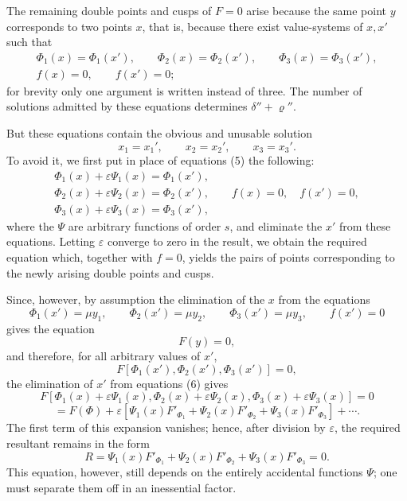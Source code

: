 \documentclass[10pt]{article}
\begin{document}
The remaining double points and cusps of \(F=0\) arise because the same point \(y\) corresponds to two points \(x\), that is, because there exist value-systems of \(x,x'\) such that
\[
\tag{5}
\begin{gathered}
\Phi_1(x)=\Phi_1(x'),\qquad
\Phi_2(x)=\Phi_2(x'),\qquad
\Phi_3(x)=\Phi_3(x'),\\
f(x)=0,\qquad f(x')=0;
\end{gathered}
\]
for brevity only one argument is written instead of three. The number of solutions admitted by these equations determines \(\delta''+\varrho''\).

But these equations contain the obvious and unusable solution
\[
x_1=x_1',\qquad x_2=x_2',\qquad x_3=x_3'.
\]
To avoid it, we first put in place of equations (5) the following:
\[
\tag{6}
\begin{gathered}
\Phi_1(x)+\varepsilon\Psi_1(x)=\Phi_1(x'),\\
\Phi_2(x)+\varepsilon\Psi_2(x)=\Phi_2(x'),\qquad f(x)=0,\quad f(x')=0,\\
\Phi_3(x)+\varepsilon\Psi_3(x)=\Phi_3(x'),
\end{gathered}
\]
where the \(\Psi\) are arbitrary functions of order \(s\), and eliminate the \(x'\) from these equations. Letting \(\varepsilon\) converge to zero in the result, we obtain the required equation which, together with \(f=0\), yields the pairs of points corresponding to the newly arising double points and cusps.

Since, however, by assumption the elimination of the \(x\) from the equations
\[
\Phi_1(x')=\mu y_1,\qquad
\Phi_2(x')=\mu y_2,\qquad
\Phi_3(x')=\mu y_3,\qquad
f(x')=0
\]
gives the equation
\[
F(y)=0,
\]
and therefore, for all arbitrary values of \(x'\),
\[
F[\Phi_1(x'),\Phi_2(x'),\Phi_3(x')]=0,
\]
the elimination of \(x'\) from equations (6) gives
\[
F[\Phi_1(x)+\varepsilon\Psi_1(x),\Phi_2(x)+\varepsilon\Psi_2(x),
\Phi_3(x)+\varepsilon\Psi_3(x)]=0
\]
\[
=F(\Phi)+\varepsilon\left[
\Psi_1(x)F'_{\Phi_1}+\Psi_2(x)F'_{\Phi_2}+\Psi_3(x)F'_{\Phi_3}
\right]+\cdots.
\]
The first term of this expansion vanishes; hence, after division by \(\varepsilon\), the required resultant remains in the form
\[
\tag{7}
R=\Psi_1(x)F'_{\Phi_1}+\Psi_2(x)F'_{\Phi_2}+\Psi_3(x)F'_{\Phi_3}=0.
\]
This equation, however, still depends on the entirely accidental functions \(\Psi\); one must separate them off in an inessential factor.
\end{document}
